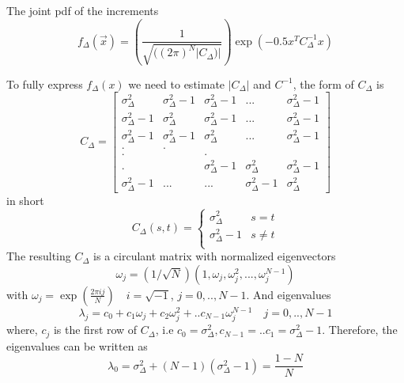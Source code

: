 \documentclass{paper}
\begin{document}
The joint pdf of the increments
\begin{equation*}
f_\Delta(\vec{x}) = \left(\frac{1}{\sqrt{((2\pi)^N |C_\Delta)|}}\right)\exp(-0.5x^TC_\Delta^{-1}x)
\end{equation*}

To fully express $f_\Delta(x)$ we need to estimate $|C_\Delta|$ and $C^{-1}$, the form of $C_\Delta$ is 
\begin{equation*}
C_\Delta = \left[
\begin{matrix}
\sigma^2_{\Delta}     & \sigma^2_{\Delta}-1 & \sigma^2_{\Delta}-1 & ...                 & \sigma^2_{\Delta}-1 \\
\sigma^2_{\Delta}-1   &\sigma^2_{\Delta}    & \sigma^2_{\Delta}-1 & ...                 & \sigma^2_{\Delta}-1 \\
\sigma^2_{\Delta}-1   & \sigma^2_{\Delta}-1 & \sigma^2_{\Delta}   & ...                 & \sigma^2_{\Delta}-1 \\
.                     &    .                &                     &                     &      \\
.                     &                     &  .                  &                     &      \\
.                     &                     & \sigma^2_{\Delta}-1 & \sigma^2_{\Delta}   & \sigma^2_{\Delta}-1  \\
\sigma^2_{\Delta}-1   & ...                 &...                  & \sigma^2_{\Delta}-1 & \sigma^2_{\Delta}
\end{matrix}
\right]
\end{equation*}
in short
\begin{equation*}
C_\Delta(s,t)=
\begin{cases}
\sigma^2_\Delta & s=t\\
\sigma^2_\Delta-1 & s\neq t\\
\end{cases}
\end{equation*}
The resulting $C_\Delta$ is a circulant matrix with normalized eigenvectors
\begin{equation*}
\omega_j = (1/\sqrt{N})(1,\omega_j,\omega_j^2,...,\omega_j^{N-1})
\end{equation*}
with $\omega_j = \exp(\frac{2\pi ij}{N}) \quad i=\sqrt{-1}$, $j=0,..,N-1$. And eigenvalues
\begin{equation*}
\lambda_j = c_0 +c_1\omega_j +c_2\omega_j^2 +..c_{N-1}\omega_j^{N-1} \quad j=0,..,N-1
\end{equation*}
where, $c_j$ is the first row of $C_\Delta$, i.e $c_0=\sigma^2_{\Delta} , c_{N-1}=..c_1=\sigma^2_{\Delta} -1$. Therefore, the eigenvalues can be written as 
\begin{equation*}
\lambda_0 =  \sigma^2_{\Delta}+(N-1)( \sigma^2_{\Delta}-1)=\frac{1-N}{N}
\end{equation*}
\end{document}
